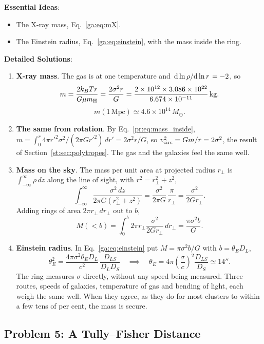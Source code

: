 \textbf{Essential Ideas}:
\begin{itemize}
	\item The X-ray mass, Eq.~\eqref{ga:eq:mX}.
	\item The Einstein radius, Eq.~\eqref{ga:eq:einstein}, with the mass inside the ring.
\end{itemize}

\textbf{Detailed Solutions}:
\begin{enumerate}[label=(\alph*)]
	\item \textbf{X-ray mass}. The gas is at one temperature and $\dv*{\ln\rho}{\ln r}=-2$, so
	\[
	m=\frac{2k_BTr}{G\mu m_{\rm H}}=\frac{2\sigma^2r}{G}=\frac{2\times10^{12}\times3.086\times10^{22}}{6.674\times10^{-11}}\,\mathrm{kg}.
	\]
	\[
	\boxed{m(1\,\mathrm{Mpc})\simeq4.6\times10^{14}\,M_\odot.}
	\]
	\item \textbf{The same from rotation}. By Eq.~\eqref{pr:eq:mass_inside}, $m=\int_0^r4\pi r'^2\sigma^2/(2\pi Gr'^2)\,dr'=2\sigma^2r/G$, so $v_{\rm circ}^2=Gm/r=2\sigma^2$, the result of Section~\ref{st:sec:polytropes}. The gas and the galaxies feel the same well.
	\item \textbf{Mass on the sky}. The mass per unit area at projected radius $r_\perp$ is $\int_{-\infty}^{\infty}\rho\,dz$ along the line of sight, with $r^2=r_\perp^2+z^2$,
	\[
	\int_{-\infty}^{\infty}\frac{\sigma^2\,dz}{2\pi G(r_\perp^2+z^2)}=\frac{\sigma^2}{2\pi G}\,\frac{\pi}{r_\perp}=\frac{\sigma^2}{2Gr_\perp}.
	\]
	Adding rings of area $2\pi r_\perp\,dr_\perp$ out to $b$,
	\[
	\boxed{M(<b)=\int_0^b2\pi r_\perp\frac{\sigma^2}{2Gr_\perp}\,dr_\perp=\frac{\pi\sigma^2b}{G}.}
	\]
	\item \textbf{Einstein radius}. In Eq.~\eqref{ga:eq:einstein} put $M=\pi\sigma^2b/G$ with $b=\theta_ED_L$,
	\[
	\theta_E^2=\frac{4\pi\sigma^2\theta_ED_L}{c^2}\,\frac{D_{LS}}{D_LD_S}
	\quad\implies\quad
	\boxed{\theta_E=4\pi\left(\frac\sigma c\right)^2\frac{D_{LS}}{D_S}\simeq14''.}
	\]
	The ring measures $\sigma$ directly, without any speed being measured. Three routes, speeds of galaxies, temperature of gas and bending of light, each weigh the same well. When they agree, as they do for most clusters to within a few tens of per cent, the mass is secure.
\end{enumerate}

\subsection{Problem 5: A Tully–Fisher Distance}
\label{ga:prob:tf}

